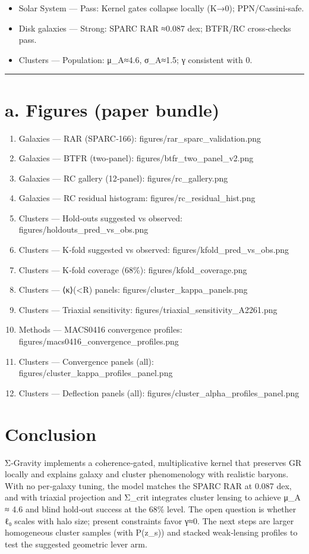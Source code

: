 \documentclass[11pt,a4paper]{article}
\begin{document}
\begin{itemize}
\item Solar System — Pass: Kernel gates collapse locally (K→0); PPN/Cassini‑safe.
\item Disk galaxies — Strong: SPARC RAR ≈0.087 dex; BTFR/RC cross‑checks pass.
\item Clusters — Population: μ\_A≈4.6, σ\_A≈1.5; γ consistent with 0.
\end{itemize}


\medskip\hrule\medskip


\section{a. Figures (paper bundle)}


\begin{enumerate}
\item Galaxies — RAR (SPARC‑166): figures/rar\_sparc\_validation.png
\item Galaxies — BTFR (two‑panel): figures/btfr\_two\_panel\_v2.png
\item Galaxies — RC gallery (12‑panel): figures/rc\_gallery.png
\item Galaxies — RC residual histogram: figures/rc\_residual\_hist.png
\item Clusters — Hold‑outs suggested vs observed: figures/holdouts\_pred\_vs\_obs.png
\item Clusters — K‑fold suggested vs observed: figures/kfold\_pred\_vs\_obs.png
\item Clusters — K‑fold coverage (68\%): figures/kfold\_coverage.png
\item Clusters — ⟨κ⟩(<R) panels: figures/cluster\_kappa\_panels.png
\item Clusters — Triaxial sensitivity: figures/triaxial\_sensitivity\_A2261.png
\item Methods — MACS0416 convergence profiles: figures/macs0416\_convergence\_profiles.png
\item Clusters — Convergence panels (all): figures/cluster\_kappa\_profiles\_panel.png
\item Clusters — Deflection panels (all): figures/cluster\_alpha\_profiles\_panel.png
\end{enumerate}


\section{Conclusion}


Σ‑Gravity implements a coherence‑gated, multiplicative kernel that preserves GR locally and explains galaxy and cluster phenomenology with realistic baryons. With no per‑galaxy tuning, the model matches the SPARC RAR at 0.087 dex, and with triaxial projection and Σ\_crit integrates cluster lensing to achieve μ\_A ≈ 4.6 and blind hold‑out success at the 68\% level. The open question is whether ℓ₀ scales with halo size; present constraints favor γ≈0. The next steps are larger homogeneous cluster samples (with P(z\_s)) and stacked weak‑lensing profiles to test the suggested geometric lever arm.
\end{document}
